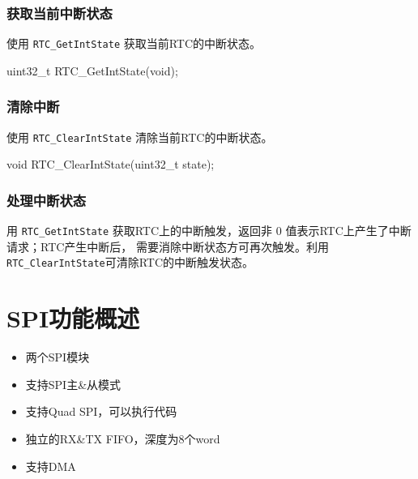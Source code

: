 \documentclass[
  12pt,
]{book}
\newenvironment{Shaded}{\begin{snugshade}}{\end{snugshade}}
\newcommand{\DataTypeTok}[1]{\textcolor[rgb]{0.13,0.29,0.53}{#1}}
\newcommand{\NormalTok}[1]{#1}
\providecommand{\tightlist}{%
  \setlength{\itemsep}{0pt}\setlength{\parskip}{0pt}}
\begin{document}
\hypertarget{ux83b7ux53d6ux5f53ux524dux4e2dux65adux72b6ux6001}{%
\subsection{获取当前中断状态}\label{ux83b7ux53d6ux5f53ux524dux4e2dux65adux72b6ux6001}}

使用 \texttt{RTC\_GetIntState} 获取当前RTC的中断状态。

\begin{Shaded}
\begin{Highlighting}[]
\DataTypeTok{uint32_t}\NormalTok{ RTC_GetIntState(}\DataTypeTok{void}\NormalTok{);}
\end{Highlighting}
\end{Shaded}

\hypertarget{ux6e05ux9664ux4e2dux65ad}{%
\subsection{清除中断}\label{ux6e05ux9664ux4e2dux65ad}}

使用 \texttt{RTC\_ClearIntState} 清除当前RTC的中断状态。

\begin{Shaded}
\begin{Highlighting}[]
\DataTypeTok{void}\NormalTok{ RTC_ClearIntState(}\DataTypeTok{uint32_t}\NormalTok{ state);}
\end{Highlighting}
\end{Shaded}

\hypertarget{ux5904ux7406ux4e2dux65adux72b6ux6001-1}{%
\subsection{处理中断状态}\label{ux5904ux7406ux4e2dux65adux72b6ux6001-1}}

用 \texttt{RTC\_GetIntState} 获取RTC上的中断触发，返回非 0 值表示RTC上产生了中断请求；RTC产生中断后，
需要消除中断状态方可再次触发。利用 \texttt{RTC\_ClearIntState}可清除RTC的中断触发状态。

\hypertarget{spiux529fux80fdux6982ux8ff0}{%
\chapter{SPI功能概述}\label{spiux529fux80fdux6982ux8ff0}}

\begin{itemize}
\tightlist
\item
  两个SPI模块
\item
  支持SPI主\&从模式
\item
  支持Quad SPI，可以执行代码
\item
  独立的RX\&TX FIFO，深度为8个word
\item
  支持DMA
\end{itemize}
\end{document}
